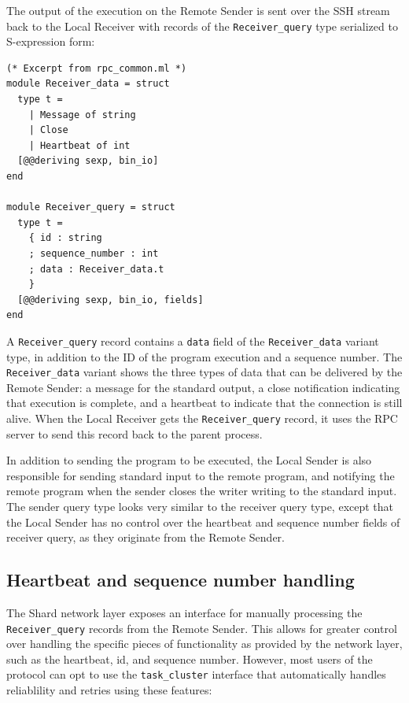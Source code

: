 \documentclass[oneside]{report}
\begin{document}
The output of the execution on the Remote Sender is sent over the SSH stream back to the Local Receiver with records of the \texttt{Receiver\_query} type serialized to S-expression form:

\begin{minipage}[c]{\textwidth-15pt}
  \begin{lstlisting}
(* Excerpt from rpc_common.ml *)
module Receiver_data = struct
  type t =
    | Message of string
    | Close
    | Heartbeat of int
  [@@deriving sexp, bin_io]
end

module Receiver_query = struct
  type t =
    { id : string
    ; sequence_number : int
    ; data : Receiver_data.t
    }
  [@@deriving sexp, bin_io, fields]
end
\end{lstlisting}
  \smallskip
\end{minipage}

A \texttt{Receiver\_query} record contains a \texttt{data} field of the \texttt{Receiver\_data} variant type, in addition to the ID of the program execution and a sequence number.
The \texttt{Receiver\_data} variant shows the three types of data that can be delivered by the Remote Sender: a message for the standard output, a close notification indicating that execution is complete, and a heartbeat to indicate that the connection is still alive.
When the Local Receiver gets the \texttt{Receiver\_query} record, it uses the RPC server to send this record back to the parent process.

In addition to sending the program to be executed, the Local Sender is also responsible for sending standard input to the remote program, and notifying the remote program when the sender closes the writer writing to the standard input.
The sender query type looks very similar to the receiver query type, except that the Local Sender has no control over the heartbeat and sequence number fields of receiver query, as they originate from the Remote Sender.

\subsection{Heartbeat and sequence number handling}

The Shard network layer exposes an interface for manually processing the \texttt{Receiver\_query} records from the Remote Sender.
This allows for greater control over handling the specific pieces of functionality as provided by the network layer, such as the heartbeat, id, and sequence number. However, most users of the protocol can opt to use the \texttt{task\_cluster} interface that automatically handles reliablility and retries using these features:
\end{document}
